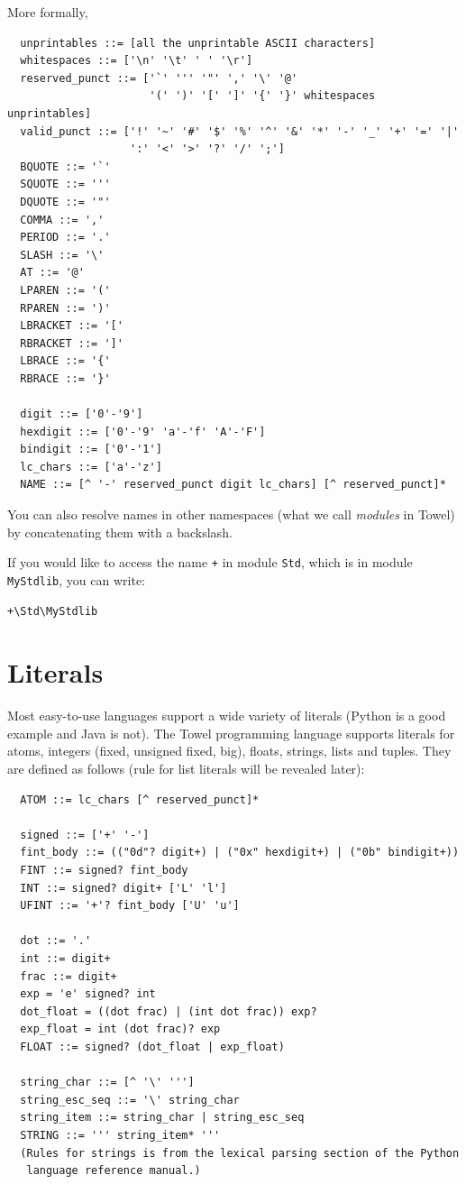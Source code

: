 \documentclass{report}
\begin{document}
More formally,
\begin{verbatim}
  unprintables ::= [all the unprintable ASCII characters]
  whitespaces ::= ['\n' '\t' ' ' '\r']
  reserved_punct ::= ['`' ''' '"' ',' '\' '@' 
                      '(' ')' '[' ']' '{' '}' whitespaces unprintables]
  valid_punct ::= ['!' '~' '#' '$' '%' '^' '&' '*' '-' '_' '+' '=' '|'
                   ':' '<' '>' '?' '/' ';']
  BQUOTE ::= '`'
  SQUOTE ::= '''
  DQUOTE ::= '"'
  COMMA ::= ','
  PERIOD ::= '.'
  SLASH ::= '\'
  AT ::= '@'
  LPAREN ::= '('
  RPAREN ::= ')'
  LBRACKET ::= '['
  RBRACKET ::= ']'
  LBRACE ::= '{'
  RBRACE ::= '}'

  digit ::= ['0'-'9']
  hexdigit ::= ['0'-'9' 'a'-'f' 'A'-'F']
  bindigit ::= ['0'-'1']
  lc_chars ::= ['a'-'z']
  NAME ::= [^ '-' reserved_punct digit lc_chars] [^ reserved_punct]*
\end{verbatim}

You can also resolve names in other namespaces (what we call \textit{modules} in Towel) by concatenating them with a backslash.

\begin{mdframed}[style=example]
If you would like to access the name \texttt{+} in module \texttt{Std}, which is in module \texttt{MyStdlib}, you can write:

\begin{verbatim}
+\Std\MyStdlib
\end{verbatim}

\end{mdframed}

\section{Literals}

Most easy-to-use languages support a wide variety of literals (Python is a good example and Java is not). The Towel programming language supports literals for atoms, integers (fixed, unsigned fixed, big), floats, strings, lists and tuples. They are defined as follows (rule for list literals will be revealed later):
\begin{verbatim}
  ATOM ::= lc_chars [^ reserved_punct]*

  signed ::= ['+' '-']
  fint_body ::= (("0d"? digit+) | ("0x" hexdigit+) | ("0b" bindigit+))
  FINT ::= signed? fint_body
  INT ::= signed? digit+ ['L' 'l']
  UFINT ::= '+'? fint_body ['U' 'u']

  dot ::= '.'
  int ::= digit+
  frac ::= digit+
  exp = 'e' signed? int
  dot_float = ((dot frac) | (int dot frac)) exp?
  exp_float = int (dot frac)? exp
  FLOAT ::= signed? (dot_float | exp_float)

  string_char ::= [^ '\' ''']
  string_esc_seq ::= '\' string_char
  string_item ::= string_char | string_esc_seq
  STRING ::= ''' string_item* '''
  (Rules for strings is from the lexical parsing section of the Python
   language reference manual.)
\end{verbatim}
\end{document}
